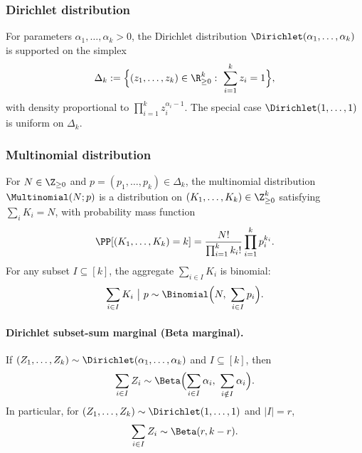 \subsubsection*{Dirichlet distribution}
For parameters \(\alpha_1,\dots,\alpha_k>0\), the Dirichlet distribution \(\Dirichlet(\alpha_1,\dots,\alpha_k)\)
is supported on the simplex
\[
\Delta_k := \Bigl\{(z_1,\dots,z_k)\in\R_{\ge 0}^k:\ \sum_{i=1}^k z_i = 1\Bigr\},
\]
with density proportional to \(\prod_{i=1}^k z_i^{\alpha_i-1}\).
The special case \(\Dirichlet(1,\dots,1)\) is uniform on \(\Delta_k\).

\subsubsection*{Multinomial distribution}
For \(N\in\Z_{\ge 0}\) and \(p=(p_1,\dots,p_k)\in\Delta_k\), the multinomial distribution \(\Multinomial(N;p)\)
is a distribution on \((K_1,\dots,K_k)\in\Z_{\ge 0}^k\) satisfying \(\sum_i K_i=N\), with probability mass function
\[
\PP[(K_1,\dots,K_k)=k]
=
\frac{N!}{\prod_{i=1}^k k_i!}\prod_{i=1}^k p_i^{k_i}.
\]
For any subset \(I\subseteq[k]\), the aggregate \(\sum_{i\in I}K_i\) is binomial:
\[
\sum_{i\in I}K_i\ \big|\ p \sim \Binomial\Bigl(N,\ \sum_{i\in I}p_i\Bigr).
\]

\paragraph{Dirichlet subset-sum marginal (Beta marginal).}
If \((Z_1,\dots,Z_k)\sim \Dirichlet(\alpha_1,\dots,\alpha_k)\) and \(I\subseteq[k]\), then
\[
\sum_{i\in I} Z_i \sim \Beta\Bigl(\sum_{i\in I}\alpha_i,\ \sum_{i\notin I}\alpha_i\Bigr).
\]
In particular, for \((Z_1,\dots,Z_k)\sim \Dirichlet(1,\dots,1)\) and \(|I|=r\),
\[
\sum_{i\in I} Z_i \sim \Beta(r,k-r).
\]
